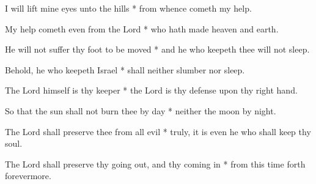 I will lift mine eyes unto the hills * from whence cometh my help.

My help cometh even from the Lord * who hath made heaven and earth.
	
He will not suffer thy foot to be moved * and he who keepeth thee will not sleep.
	
Behold, he who keepeth Israel * shall neither slumber nor sleep.
	
The Lord himself is thy keeper * the Lord is thy defense upon thy right hand.
	
So that the sun shall not burn thee by day * neither the moon by night.
	
The Lord shall preserve thee from all evil * truly, it is even he who shall keep thy soul.
	
The Lord shall preserve thy going out, and thy coming in * from this time forth forevermore.